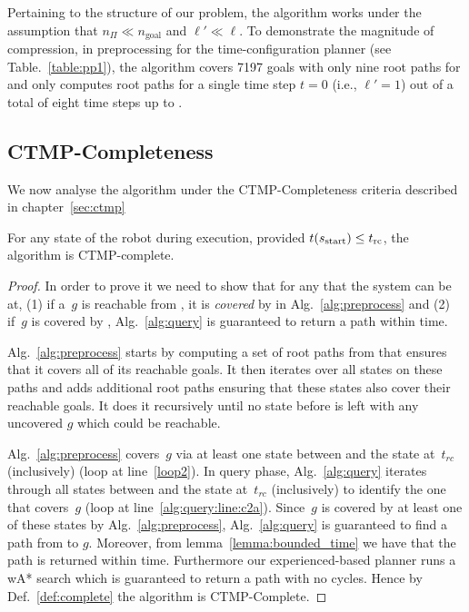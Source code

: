 \documentclass[a4paper]{report}
\begin{document}
Pertaining to the structure of our problem, the algorithm works under the assumption that $n_\Pi \ll n_{\text{goal}}$ and $\ell' \ll \ell$.  To demonstrate the magnitude of compression, in preprocessing for the time-configuration planner (see Table.~\ref{table:pp1}), the algorithm covers 7197 goals with only nine root paths for \Shome and only computes root paths for a single time step $t = 0$ (i.e., $\ell' = 1$) out of a total of eight time steps up to \Trc. 


\subsection{CTMP-Completeness}
We now analyse the algorithm under the CTMP-Completeness criteria described in chapter~\ref{sec:ctmp}
\vspace{2mm}
\begin{theorem}
For any state \Sstart of the robot during execution, provided $t(s_{\textrm{start}}) \leq t_{\textrm{rc}}$, the algorithm is CTMP-complete.
\end{theorem}

\begin{proof}[Proof]
In order to prove it we need to show that for any \Sstart that the system can be at, (1) if a~$g$ is reachable from \Sstart, it is \emph{covered} by \Sstart in Alg.~\ref{alg:preprocess} and (2) if~$g$ is covered by \Sstart, Alg.~\ref{alg:query} is guaranteed to return a path within \Tbound time.

Alg.~\ref{alg:preprocess} starts by computing a set of root paths from \Shome that ensures that it covers all of its reachable goals. It then iterates over all states on these paths and adds additional root paths ensuring that these states also cover their reachable goals. It does it recursively until no state \Sstart before \Trc is left with any uncovered $g$ which could be reachable.
    
Alg.~\ref{alg:preprocess} covers~$g$ via at least one state between \Sstart and the state at~$t_{rc}$ (inclusively) (loop at line~\ref{loop2}).
In query phase, Alg.~\ref{alg:query} iterates through all states between \Sstart and the state at~$t_{rc}$ (inclusively) to identify the one that covers~$g$ (loop at line~\ref{alg:query:line:c2a}). Since~$g$ is covered by at least one of these states by Alg.~\ref{alg:preprocess}, Alg.~\ref{alg:query} is guaranteed to find a path from \Sstart to $g$.
%
Moreover, from lemma~\ref{lemma:bounded_time} we have that the path is returned within \Tbound time.
%
Furthermore our experienced-based planner runs a wA* search which is guaranteed to return a path with no cycles. Hence by Def.~\ref{def:complete} the algorithm is CTMP-Complete.
\end{proof}
\end{document}
